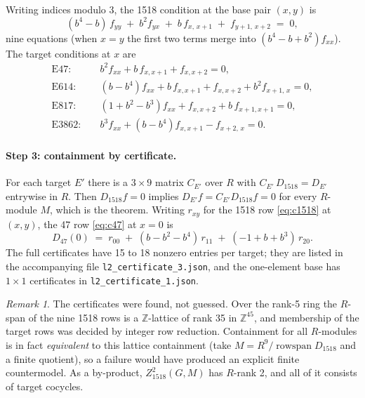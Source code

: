 \documentclass[11pt]{article}
\theoremstyle{remark}\newtheorem*{remark}{Remark}
\newcommand{\Z}{\mathbb{Z}}
\newcommand{\Eq}[1]{\mathrm{E}#1}
\begin{document}
Writing indices modulo 3, the 1518 condition at the base pair $(x,y)$ is
\begin{equation}\label{eq:c1518}
(b^{4}-b)\,f_{yy} \;+\; b^{2}f_{yx} \;+\; b\,f_{x,\,x+1} \;+\; f_{y+1,\,x+2} \;=\; 0 ,
\end{equation}
nine equations (when $x=y$ the first two terms merge into $(b^{4}-b+b^{2})f_{xx}$). The target conditions at $x$ are
\begin{align}
\Eq{47}:&\quad b^{2}f_{xx}+b\,f_{x,x+1}+f_{x,x+2}=0, \label{eq:c47}\\
\Eq{614}:&\quad (b-b^{4})f_{xx}+b\,f_{x,x+1}+f_{x,x+2}+b^{2}f_{x+1,\,x}=0,\\
\Eq{817}:&\quad (1+b^{2}-b^{3})f_{xx}+f_{x,x+2}+b\,f_{x+1,x+1}=0,\\
\Eq{3862}:&\quad b^{3}f_{xx}+(b-b^{4})f_{x,x+1}-f_{x+2,\,x}=0 .
\end{align}

\paragraph{Step 3: containment by certificate.}
For each target $E'$ there is a $3\times 9$ matrix $C_{E'}$ over $R$ with $C_{E'}\,D_{1518}=D_{E'}$ entrywise in $R$. Then $D_{1518}f=0$ implies $D_{E'}f=C_{E'}D_{1518}f=0$ for every $R$-module $M$, which is the theorem. Writing $r_{xy}$ for the 1518 row \eqref{eq:c1518} at $(x,y)$, the 47 row \eqref{eq:c47} at $x=0$ is
\begin{equation}\label{eq:cert}
D_{47}(0) \;=\; r_{00} \;+\; (b-b^{2}-b^{4})\,r_{11} \;+\; (-1+b+b^{3})\,r_{20}.
\end{equation}
The full certificates have 15 to 18 nonzero entries per target; they are listed in the accompanying file \texttt{l2\_certificate\_3.json}, and the one-element base has $1\times1$ certificates in \texttt{l2\_certificate\_1.json}.

\begin{remark}
The certificates were found, not guessed. Over the rank-5 ring the $R$-span of the nine 1518 rows is a $\Z$-lattice of rank 35 in $\Z^{45}$, and membership of the target rows was decided by integer row reduction. Containment for all $R$-modules is in fact \emph{equivalent} to this lattice containment (take $M=R^{9}/\operatorname{rowspan}D_{1518}$ and a finite quotient), so a failure would have produced an explicit finite countermodel. As a by-product, $Z^{2}_{1518}(G,M)$ has $R$-rank 2, and all of it consists of target cocycles.
\end{remark}
\end{document}
